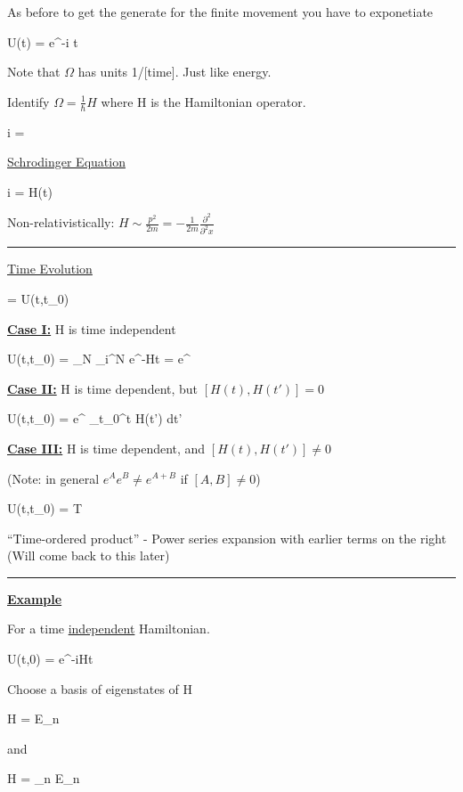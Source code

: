 {As before to get the generate for the finite movement you have to exponetiate

\be
U(t) = e^{-i \Omega t}
\ee

Note that $\Omega$ has units 1/[time].  
Just like energy.

Identify $\Omega = \frac{1}{\hbar}H$  where H is the Hamiltonian operator.


\be
i \ket{\psi} = \Omega \ket{\psi}
\ee


\underline{Schrodinger Equation}

\be
i \hbar {}\ket{\psi} = H(t) \ket{\psi}
\ee

Non-relativistically:  $H \sim \frac{p^2}{2m} = -\frac{1}{2m} \frac{\partial^2}{\partial^2 x}$

\noindent\rule{\textwidth}{1pt}

\underline{Time Evolution}

\be
{} = U(t,t_0) 
\ee


\textbf{\underline{Case I:}} H is time independent

\be
U(t,t_0) = \lim_{N\rightarrow\infty} \prod\limits_{i}^{N} e^{-H\Delta t}  = e^{}
\ee


\textbf{\underline{Case II:}} H is time dependent, but $[H(t), H(t')] = 0$

\be
U(t,t_0) =  e^{ \int_{t_0}^{t} H(t') dt'}
\ee


\textbf{\underline{Case III:}} H is time dependent, and $[H(t), H(t')] \ne 0$

(Note: in general $e^A e^B \ne e^{A+B}$ if $[A,B] \ne 0$)

\be
U(t,t_0) =  T 
\ee

``Time-ordered product'' - Power series expansion with earlier terms on the right
(Will come back to this later)


\noindent\rule{\textwidth}{1pt}

\textbf{\underline{Example}}

For a time \underline{independent} Hamiltonian.

\be
U(t,0) = e^{-iHt}
\ee

Choose a basis of eigenstates of H

\be
H = E_n
\ee

and 

\be
H = \sum\limits_{n} E_n 
\ee

}
